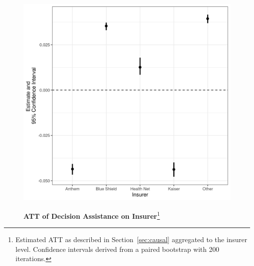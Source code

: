 \documentclass[12pt]{article}
\begin{document}
\newpage
\begin{figure}[htb]
\centering
\footnotesize
\begin{minipage}[h]{6in}
\caption[caption]{\textbf{ATT of Decision Assistance on Insurer}\footnote{Estimated ATT as described in Section~\ref{sec:causal} aggregated to the insurer level. Confidence intervals derived from a paired bootstrap with 200 iterations.}}
\centerline{%
    \includegraphics[scale=0.75]{figures/choice_insurer.png}
}
\label{fig:choice-insurer}
\end{minipage}
\end{figure}
\end{document}
